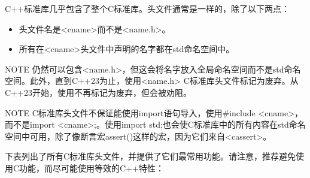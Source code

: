 C++标准库几乎包含了整个C标准库。头文件通常是一样的，除了以下两点：

\begin{itemize}
\item
头文件名是<cname>而不是<name.h>。

\item
所有在<cname>头文件中声明的名字都在std命名空间中。
\end{itemize}

\begin{myNotic}{NOTE}
仍然可以包含<name.h>，但这会将名字放入全局命名空间而不是std命名空间。此外，直到C++23为止，使用<name.h> C标准库头文件标记为废弃。从C++23开始，使用不再标记为废弃，但会被劝阻。
\end{myNotic}


\begin{myNotic}{NOTE}
C标准库头文件不保证能使用import语句导入，使用\#include <cname>，而不是import <cname>;。使用import std;也会使C标准库中的所有内容在std命名空间中可用，除了像断言宏assert()这样的宏，因为它们来自<cassert>。
\end{myNotic}

下表列出了所有C标准库头文件，并提供了它们最常用功能。请注意，推荐避免使用C功能，而尽可能使用等效的C++特性：

